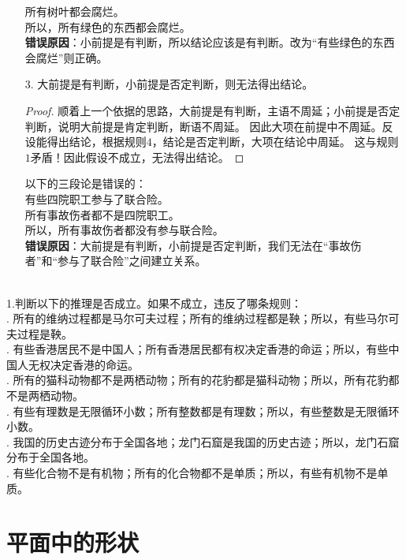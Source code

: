\documentclass[12pt,UTF8]{ctexbook}
\begin{document}
\begin{enumerate}
\begin{ex*}
        \indent 所有树叶都会腐烂。\\
        \indent 所以，所有绿色的东西都会腐烂。\\
        \textbf{错误原因}：小前提是有判断，所以结论应该是有判断。改为“有些绿色的东西会腐烂”则正确。
    \end{ex*}
    \item[3.] 大前提是有判断，小前提是否定判断，则无法得出结论。
    \begin{proof}
        顺着上一个依据的思路，大前提是有判断，主语不周延；小前提是否定判断，说明大前提是肯定判断，断语不周延。
        因此大项在前提中不周延。反设能得出结论，根据规则$4$，结论是否定判断，大项在结论中周延。
        这与规则$1$矛盾！因此假设不成立，无法得出结论。
    \end{proof}
    \begin{ex*}
        以下的三段论是错误的： \\
        \indent 有些四院职工参与了联合险。\\
        \indent 所有事故伤者都不是四院职工。\\
        \indent 所以，所有事故伤者都没有参与联合险。\\
        \textbf{错误原因}：大前提是有判断，小前提是否定判断，我们无法在“事故伤者”和“参与了联合险”之间建立关系。
    \end{ex*}
\end{enumerate}
\begin{xt}\label{xt:0-1-10}
    \mbox{} \\
    \indent 1.判断以下的推理是否成立。如果不成立，违反了哪条规则：\\
    . 所有的维纳过程都是马尔可夫过程；所有的维纳过程都是鞅；所以，有些马尔可夫过程是鞅。\\
    . 有些香港居民不是中国人；所有香港居民都有权决定香港的命运；所以，有些中国人无权决定香港的命运。\\
    . 所有的猫科动物都不是两栖动物；所有的花豹都是猫科动物；所以，所有花豹都不是两栖动物。\\
    . 有些有理数是无限循环小数；所有整数都是有理数；所以，有些整数是无限循环小数。\\
    . 我国的历史古迹分布于全国各地；龙门石窟是我国的历史古迹；所以，龙门石窟分布于全国各地。\\
    . 有些化合物不是有机物；所有的化合物都不是单质；所以，有些有机物不是单质。    
\end{xt}

\chapter{平面中的形状}
\end{document}
